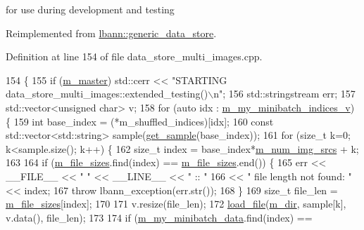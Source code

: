 for use during development and testing 



Reimplemented from \hyperlink{classlbann_1_1generic__data__store_ae569426f71f9317e88fe1078d58c98e7}{lbann\+::generic\+\_\+data\+\_\+store}.



Definition at line 154 of file data\+\_\+store\+\_\+multi\+\_\+images.\+cpp.


\begin{DoxyCode}
154                                                \{
155   \textcolor{keywordflow}{if} (\hyperlink{classlbann_1_1generic__data__store_a143fd33ef3a53180bc62745e369c16f8}{m\_master}) std::cerr << \textcolor{stringliteral}{"STARTING data\_store\_multi\_images::extended\_testing()\(\backslash\)n"};
156   std::stringstream err;
157   std::vector<unsigned char> v;
158   \textcolor{keywordflow}{for} (\textcolor{keyword}{auto} idx : \hyperlink{classlbann_1_1generic__data__store_a41f7fec1f1f3d6568a5765be7a6784eb}{m\_my\_minibatch\_indices\_v}) \{
159     \textcolor{keywordtype}{int} base\_index = (*m\_shuffled\_indices)[idx];
160     \textcolor{keyword}{const} std::vector<std::string> sample(\hyperlink{classlbann_1_1data__store__multi__images_a39108690484fe407efafefe6a4b0947b}{get\_sample}(base\_index));
161     \textcolor{keywordflow}{for} (\textcolor{keywordtype}{size\_t} k=0; k<sample.size(); k++) \{
162       \textcolor{keywordtype}{size\_t} index = base\_index*\hyperlink{classlbann_1_1data__store__image_a2f660053e7621a9cc70a7c4eef53c9cc}{m\_num\_img\_srcs} + k; 
163 
164       \textcolor{keywordflow}{if} (\hyperlink{classlbann_1_1data__store__image_a1903176a4b305fd42617ea1cb6d997ae}{m\_file\_sizes}.find(index) == \hyperlink{classlbann_1_1data__store__image_a1903176a4b305fd42617ea1cb6d997ae}{m\_file\_sizes}.end()) \{
165         err << \_\_FILE\_\_ << \textcolor{stringliteral}{" "} << \_\_LINE\_\_ << \textcolor{stringliteral}{" :: "} 
166             << \textcolor{stringliteral}{" file length not found: "} << index;
167         \textcolor{keywordflow}{throw} lbann\_exception(err.str());
168       \}
169       \textcolor{keywordtype}{size\_t} file\_len = \hyperlink{classlbann_1_1data__store__image_a1903176a4b305fd42617ea1cb6d997ae}{m\_file\_sizes}[index];
170 
171       v.resize(file\_len);
172       \hyperlink{classlbann_1_1data__store__image_a8a53bab58d75554821f90c38d14078aa}{load\_file}(\hyperlink{classlbann_1_1generic__data__store_ab479c127f00ce550c7433b90e40a5a3d}{m\_dir}, sample[k], v.data(), file\_len);
173 
174       \textcolor{keywordflow}{if} (\hyperlink{classlbann_1_1data__store__image_a627a08479de191dcef74e633c4cded8c}{m\_my\_minibatch\_data}.find(index) == 

\end{DoxyCode}
